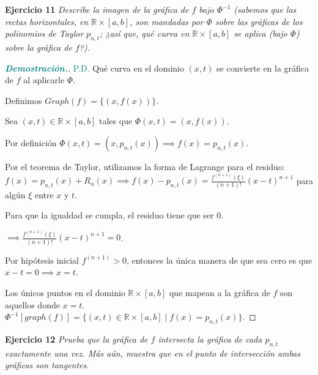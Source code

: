 \documentclass[12pt, letterpaper]{article}
\begin{document}
\vspace{0.4cm}
\noindent \textbf{Ejercicio 11} \textit{Describe la imagen de la gráfica de $f$ bajo $\Phi^{-1}$ (sabemos que las rectas horizontales, en $\mathbb{R} \times [a,b]$, son mandadas por $\Phi$ sobre las gráficas de los polinomios de Taylor $p_{n,t}$; ¿así que, qué curva en $\mathbb{R} \times [a,b]$ se aplica (bajo $\Phi$) sobre la gráfica de $f$?).}

\begin{proof}[\textbf{\textcolor{teal}{Demostración.}}]
    {\textcolor{teal}{P.D.}} Qué curva en el dominio $(x,t)$ se convierte en la gráfica de $f$ al aplicarle $\Phi$.
    
    Definimos $Graph(f) = \{(x, f(x))\}$. 
    
    Sea $(x,t) \in \mathbb{R} \times [a,b]$ tales que $\Phi(x,t) = (x, f(x))$. 
    
    Por definición $\Phi(x,t) = (x, p_{n,t}(x)) \implies f(x) = p_{n,t}(x)$.
    
    Por el teorema de Taylor, utilizamos la forma de Lagrange para el residuo: $f(x) = p_{n,t}(x) + R_{n}(x) \implies f(x) - p_{n,t}(x) = \frac{f^{(n+1)}(\xi)}{(n+1)!}(x-t)^{n+1}$ para algún $\xi$ entre $x$ y $t$.
    
    Para que la igualdad se cumpla, el residuo tiene que ser 0.
    
    $\implies \frac{f^{(n+1)}(\xi)}{(n+1)!}(x-t)^{n+1} = 0$. 
    
    Por hipótesis inicial $f^{(n+1)} > 0$, entonces la única manera de que sea cero es que $x-t=0 \implies x=t$.
    
    Los únicos puntos en el dominio $\mathbb{R} \times [a,b]$ que mapean a la gráfica de $f$ son aquellos donde $x=t$.
    $\Phi^{-1}[graph(f)] = \{(x,t) \in \mathbb{R} \times [a,b] \mid f(x) = p_{n,t}(x)\}$.
\end{proof}

\vspace{0.4cm}
\noindent \textbf{Ejercicio 12} \textit{Prueba que la gráfica de $f$ intersecta la gráfica de cada $p_{n,t}$ exactamente una vez. Más aún, muestra que en el punto de intersección ambas gráficas son tangentes.}
\end{document}
